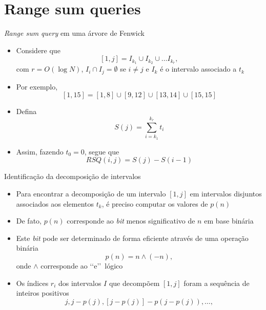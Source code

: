 \section{Range sum queries}

\begin{frame}[fragile]{\textit{Range sum query} em uma árvore de Fenwick}

    \begin{itemize}
        \item Considere que 
        \[
            [1, j] = I_{k_1} \cup I_{k_2} \cup \ldots I_{k_r},
        \]
        com $r = O(\log N)$, $I_i \cap I_j = \emptyset$ se $i\neq j$ e $I_k$ é o intervalo associado
        a $t_k$

        \item Por exemplo,
        \[
            [1, 15] = [1, 8]\cup [9, 12]\cup [13, 14]\cup [15, 15]
        \]

        \item Defina
        \[
            S(j) = \sum_{i = k_1}^{k_r} t_i
        \]

        \item Assim, fazendo $t_0 = 0$, segue que
        \[
            RSQ(i, j) = S(j) - S(i - 1)
        \]

    \end{itemize}

\end{frame}

\begin{frame}[fragile]{Identificação da decomposição de intervalos}

    \begin{itemize}
        \item Para encontrar a decomposição de um intervalo $[1, j]$ em intervalos disjuntos 
            associados aos elementos $t_k$, é preciso computar os valores de $p(n)$

        \item De fato, $p(n)$ corresponde ao \textit{bit} menos significativo de $n$ em base
            binária

        \item Este \textit{bit} pode ser determinado de forma eficiente através de uma operação
            binária
        \[
            p(n) = n \land (-n),
        \]
        onde $\land$ corresponde ao \lq\lq e\rq\rq\ lógico

        \item Os índices $r_i$ dos intervalos $I$ que decompõem $[1,j]$ foram a sequência
            de inteiros positivos 
        \[
            j, j - p(j), [j - p(j)] - p(j - p(j)), \ldots,
        \]
    \end{itemize}

\end{frame}

